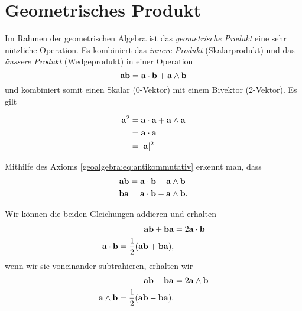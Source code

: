 \section{Geometrisches Produkt}
Im Rahmen der geometrischen Algebra ist das \emph{geometrische Produkt} eine sehr
nützliche Operation. Es kombiniert das \emph{innere Produkt} (Skalarprodukt) und das
\emph{äussere Produkt} (Wedgeprodukt) in einer Operation
\begin{equation}
\mathbf{a} \mathbf{b} = \mathbf{a} \cdot \mathbf{b} + \mathbf{a} \wedge \mathbf{b}
\end{equation}
und kombiniert somit einen Skalar (0-Vektor) mit einem Bivektor (2-Vektor).
Es gilt
\begin{lemma}
\begin{equation}
  \begin{aligned}
    \mathbf{a}^2 &= \mathbf{a} \cdot \mathbf{a} + \mathbf{a} \wedge \mathbf{a} \\
    &= \mathbf{a} \cdot \mathbf{a} \\
    &= |\mathbf{a}|^2
  \end{aligned}
\end{equation}
\end{lemma}
Mithilfe des Axioms \eqref{geoalgebra:eq:antikommutativ} erkennt man, dass
\begin{align}
  \mathbf{a} \mathbf{b} &= \mathbf{a} \cdot \mathbf{b} + \mathbf{a} \wedge \mathbf{b} \\
  \mathbf{b} \mathbf{a} &= \mathbf{a} \cdot \mathbf{b} - \mathbf{a} \wedge \mathbf{b}.
\end{align}

Wir können die beiden Gleichungen addieren und erhalten
\begin{align}
  \mathbf{a} \mathbf{b} + \mathbf{b} \mathbf{a} &= 2 \mathbf{a} \cdot \mathbf{b} \\
  \mathbf{a} \cdot \mathbf{b} = \frac{1}{2} (\mathbf{a} \mathbf{b} + \mathbf{b} \mathbf{a}),
\end{align}
wenn wir sie voneinander subtrahieren, erhalten wir
\begin{align}
  \mathbf{a} \mathbf{b} - \mathbf{b} \mathbf{a} &= 2 \mathbf{a} \wedge \mathbf{b} \\
  \mathbf{a} \wedge \mathbf{b} = \frac{1}{2} (\mathbf{a} \mathbf{b} - \mathbf{b} \mathbf{a}).
\end{align}
